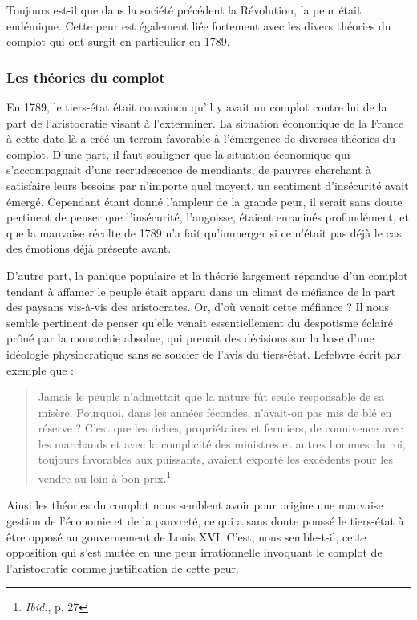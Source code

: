 \documentclass[a4paper,11pt,]{scrartcl}
\begin{document}
Toujours est-il que dans la société précédent la Révolution, la peur était endémique. Cette peur  est également liée fortement avec les divers théories du complot qui ont surgit en particulier en 1789.

\subsubsection{Les théories du complot}

En 1789, le tiers-état était convaincu qu'il y avait un complot contre lui de la part de l'aristocratie visant à l'exterminer. La situation économique de la France à cette date là a créé un terrain favorable à l'émergence de diverses théories du complot. D'une part, il faut souligner que la situation économique qui s'accompagnait d'une recrudescence de mendiants, de pauvres cherchant à satisfaire leurs besoins par n'importe quel moyent, un sentiment d'insécurité avait émergé. Cependant étant donné l'ampleur de la grande peur, il serait sans doute pertinent de penser que l'insécurité, l'angoisse, étaient enracinés profondément, et que la mauvaise récolte de 1789 n'a fait qu'immerger si ce n'était pas déjà le cas des émotions déjà présente avant.

D'autre part, la panique populaire et la théorie largement répandue d'un complot tendant à affamer le peuple était apparu dans un climat de méfiance de la part des paysans vis-à-vis des aristocrates. Or, d'où venait cette méfiance ? Il nous semble pertinent de penser qu'elle venait essentiellement du despotisme éclairé prôné par la monarchie absolue, qui prenait des décisions sur la base d'une idéologie physiocratique sans se soucier de l'avis du tiers-état. Lefebvre écrit par exemple que :
\begin{quotation}
 Jamais le peuple n'admettait que la nature fût seule responsable de sa misère. Pourquoi, dans les années fécondes, n'avait-on pas mis de blé en réserve ? C'est que les riches, propriétaires et fermiers, de connivence avec les marchands et avec la complicité des ministres et autres hommes du roi, toujours favorables aux puissants, avaient exporté les excédents pour les vendre au loin à bon prix.\footnote{\emph{Ibid.}, p. 27}
\end{quotation}
Ainsi les théories du complot nous semblent avoir pour origine une mauvaise gestion de l'économie et de la pauvreté, ce qui a sans doute poussé le tiers-état à être opposé au gouvernement de Louis XVI. C'est, nous semble-t-il, cette opposition qui s'est mutée en une peur irrationnelle invoquant le complot de l'aristocratie comme justification de cette peur.
\end{document}
